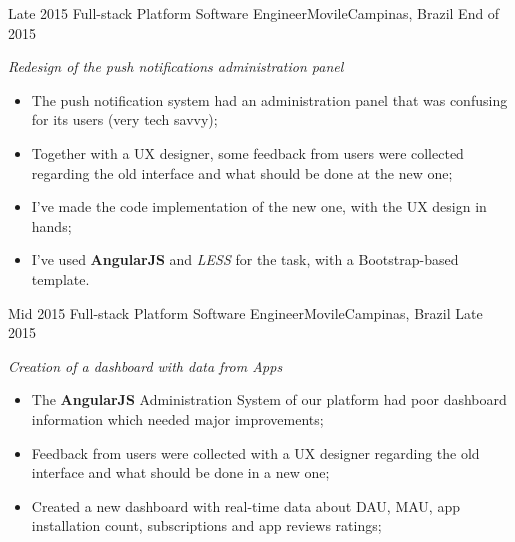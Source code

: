 \begin{experiences}
{\begin{itemize}
          \end{itemize}
        }{}
  \experience
  {Late 2015} {Full-stack Platform Software Engineer}{Movile}{Campinas, Brazil}
  {End of 2015}
        {
        \emph{Redesign of the push notifications administration panel}\\
          \begin{itemize}
            \item The push notification system had an administration panel that was confusing for its users (very tech savvy);
            \item Together with a UX designer, some feedback from users were collected regarding the old interface and what should
            be done at the new one;
            \item I've made the code implementation of the new one, with the UX design in hands;
            \item I've used \textbf{AngularJS} and \emph{LESS} for the task, with a Bootstrap-based template.\\
          \end{itemize}
        }{}
  \experience
  {Mid 2015} {Full-stack Platform Software Engineer}{Movile}{Campinas, Brazil}
  {Late 2015}
        {
        \emph{Creation of a dashboard with data from Apps}\\
          \begin{itemize}
            \item The \textbf{AngularJS} Administration System of our platform had poor dashboard information which needed major improvements;
            \item Feedback from users were collected with a UX designer regarding the old interface and what should be done in a new one;
            \item Created a new dashboard with real-time data about DAU, MAU, app installation count, subscriptions and app reviews ratings;
          \end{itemize}
        }{}
\end{experiences}
